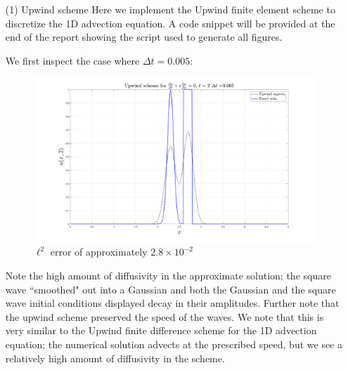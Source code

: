 \documentclass{article}
\begin{document}
\begin{itemize}
    \item[(1)] Upwind scheme
    \newline\newline
    Here we implement the Upwind finite element scheme to discretize the 1D advection equation. A code snippet will be provided at the end of the report showing the script used to generate all figures. 

    We first inspect the case where $\Delta t = 0.005$:

    \begin{figure}[H]
        \centering
        \includegraphics[scale = 0.25]{upwind_dt_005.png}
        \caption{$\ell^2$ error of approximately $2.8 \times 10^{-2}$}
    \end{figure}
    Note the high amount of diffusivity in the approximate solution; the square wave ``smoothed" out into a Gaussian and both the Gaussian and the square wave initial conditions displayed decay in their amplitudes. Further note that the upwind scheme preserved the speed of the waves. We note that this is very similar to the Upwind finite difference scheme for the 1D advection equation; the numerical solution advects at the prescribed speed, but we see a relatively high amount of diffusivity in the scheme. 


\end{itemize}
\end{document}
